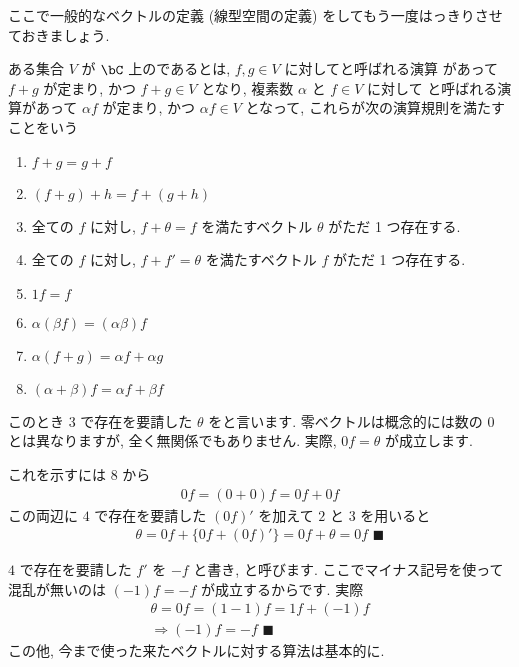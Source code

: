 \documentclass[openany, a4paper, oneside]{jsbook}
\begin{document}
ここで一般的なベクトルの定義 (線型空間の定義) をしてもう一度はっきりさせておきましょう.
\begin{defn}
ある集合 $V$ が $\bC$ 上のであるとは,
$f,g \in V$ に対してと呼ばれる演算
があって $f+g$ が定まり, かつ $f+g \in V$ となり, 複素数 $\alpha$ と $f\in V$ に対して
と呼ばれる演算があって
$\alpha f$ が定まり, かつ $\alpha f \in V$ となって, これらが次の演算規則を満たすことをいう
\begin{enumerate}
\item  $f + g = g + f$
\item  $(f + g ) + h = f + ( g + h )$
\item 全ての $f$ に対し,  $f + \theta = f$ を満たすベクトル $\theta$ がただ 1 つ存在する.
\item 全ての $f$ に対し,  $f + f' = \theta$ を満たすベクトル $f$ がただ 1 つ存在する.
\item  $1f = f$
\item  $\alpha (\beta f) = (\alpha \beta) f$
\item  $\alpha (f + g ) = \alpha f + \alpha g$
\item  $(\alpha + \beta ) f = \alpha f + \beta f$
\end{enumerate}
\end{defn}
このとき 3 で存在を要請した $\theta$ をと言います.
零ベクトルは概念的には数の $0$ とは異なりますが, 全く無関係でもありません. 実際,  $0f=\theta$ が成立します.

これを示すには 8 から
\begin{align}
    0f= (0+0) f=0f + 0f
\end{align}
この両辺に $4$ で存在を要請した $(0f)'$ を加えて $2$ と $3$ を用いると
\begin{align}
    \theta = 0f + \{ 0f + (0f)' \} = 0f + \theta = 0f \,\, \blacksquare
\end{align}

 $4$ で存在を要請した $f'$ を $-f$ と書き, と呼びます. ここでマイナス記号を使って
混乱が無いのは $(-1) f=-f$ が成立するからです. 実際
\begin{gather}
    \theta = 0f = (1-1) f = 1f + (-1) f \\
    \Longrightarrow
    (-1) f = -f \,\, \blacksquare
\end{gather}
この他, 今まで使った来たベクトルに対する算法は基本的に.
\end{document}
